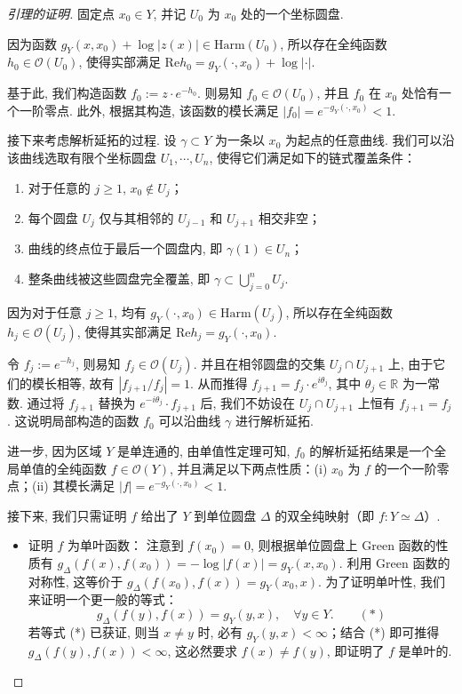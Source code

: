 \begin{proof}[引理的证明]
固定点 $x_0 \in Y$, 并记 $U_0$ 为 $x_0$ 处的一个坐标圆盘. 

因为函数 $g_Y(x, x_0) + \log|z(x)| \in \mathrm{Harm}(U_0)$, 所以存在全纯函数 $h_0 \in \mathcal{O}(U_0)$, 使得实部满足 $\mathrm{Re}h_0 = g_Y(\cdot, x_0) + \log|\cdot|$. 

基于此, 我们构造函数 $f_0 := z \cdot e^{-h_0}$. 则易知 $f_0 \in \mathcal{O}(U_0)$, 并且 $f_0$ 在 $x_0$ 处恰有一个一阶零点. 此外, 根据其构造, 该函数的模长满足 $|f_0| = e^{-g_Y(\cdot, x_0)} < 1$.

接下来考虑解析延拓的过程. 设 $\gamma \subset Y$ 为一条以 $x_0$ 为起点的任意曲线. 我们可以沿该曲线选取有限个坐标圆盘 $U_1, \cdots, U_n$, 使得它们满足如下的链式覆盖条件：
\begin{enumerate}
    \item 对于任意的 $j \geqslant 1$, $x_0 \notin U_j$；
    \item 每个圆盘 $U_j$ 仅与其相邻的 $U_{j-1}$ 和 $U_{j+1}$ 相交非空；
    \item 曲线的终点位于最后一个圆盘内, 即 $\gamma(1) \in U_n$；
    \item 整条曲线被这些圆盘完全覆盖, 即 $\gamma \subset \bigcup_{j=0}^n U_j$.
\end{enumerate}
因为对于任意 $j \geqslant 1$, 均有 $g_Y(\cdot, x_0) \in \mathrm{Harm}(U_j)$, 所以存在全纯函数 $h_j \in \mathcal{O}(U_j)$, 使得其实部满足 $\mathrm{Re}h_j = g_Y(\cdot, x_0)$. 

令 $f_j := e^{-h_j}$, 则易知 $f_j \in \mathcal{O}(U_j)$. 并且在相邻圆盘的交集 $U_j \cap U_{j+1}$ 上, 由于它们的模长相等, 故有 $|f_{j+1} / f_j| = 1$. 从而推得 $f_{j+1} = f_j \cdot e^{i\theta_j}$, 其中 $\theta_j \in \mathbb{R}$ 为一常数. 通过将 $f_{j+1}$ 替换为 $e^{-i\theta_j} \cdot f_{j+1}$ 后, 我们不妨设在 $U_j \cap U_{j+1}$ 上恒有 $f_{j+1} = f_j$. 这说明局部构造的函数 $f_0$ 可以沿曲线 $\gamma$ 进行解析延拓. 

进一步, 因为区域 $Y$ 是单连通的, 由单值性定理可知, $f_0$ 的解析延拓结果是一个全局单值的全纯函数 $f \in \mathcal{O}(Y)$, 并且满足以下两点性质：(i) $x_0$ 为 $f$ 的一个一阶零点；(ii) 其模长满足 $|f| = e^{-g_Y(\cdot, x_0)} < 1$. 

接下来, 我们只需证明 $f$ 给出了 $Y$ 到单位圆盘 $\Delta$ 的双全纯映射（即 $f: Y \simeq \Delta$）. 

\begin{itemize}
    \item [(a)]\qquad 证明 $f$ 为单叶函数：
注意到 $f(x_0) = 0$, 则根据单位圆盘上 Green 函数的性质有 $g_\Delta(f(x), f(x_0)) = -\log|f(x)| = g_Y(x, x_0)$. 利用 Green 函数的对称性, 这等价于 $g_\Delta(f(x_0), f(x)) = g_Y(x_0, x)$. 为了证明单叶性, 我们来证明一个更一般的等式：
\[ g_\Delta(f(y), f(x)) = g_Y(y, x), \quad \forall y \in Y. \qquad (*) \]
若等式 (*) 已获证, 则当 $x \neq y$ 时, 必有 $g_Y(y, x) < \infty$；结合 (*) 即可推得 $g_\Delta(f(y), f(x)) < \infty$, 这必然要求 $f(x) \neq f(y)$, 即证明了 $f$ 是单叶的. 


\end{itemize}
\end{proof}

